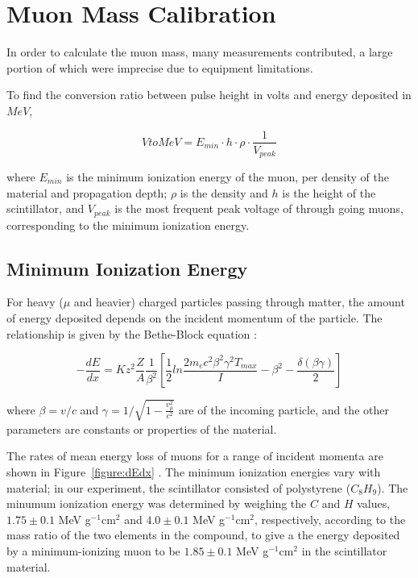 
\section{Muon Mass Calibration}

In order to calculate the muon mass, many measurements contributed, a
large portion of which were imprecise due to equipment limitations. 

To find the conversion ratio between pulse height in volts and energy
deposited in $MeV$, 

\begin{equation} VtoMeV = E_{min}\cdot h\cdot\rho\cdot\frac{1}{V_{peak}}\end{equation}   

where $E_{min}$ is the minimum ionization energy of the muon, per
density of the material and propagation depth; $\rho$ is the density
and $h$ is the height of the scintillator, and $V_{peak}$ is the most
frequent peak voltage of through going muons, corresponding to the
minimum ionization energy.

\subsection{Minimum Ionization Energy}

For heavy ($\mu$ and heavier) charged particles passing through
matter, the amount of energy deposited depends on the incident
momentum of the particle. The relationship is given by the Bethe-Block
equation \cite{yao}:

\begin{equation}
-\frac{dE}{dx} = Kz^2\frac{Z}{A}\frac{1}{\beta^2}\left[\frac{1}{2}ln\frac{2m_ec^2\beta^2\gamma^2T_{max}}{I} - \beta^2 - \frac{\delta(\beta\gamma)}{2}\right]
\end{equation}

where $\beta = v/c$ and $\gamma = 1/\sqrt{1 - \frac{v_{\mu}^2}{c^2}}$
are of the incoming particle, and the other parameters are constants
or properties of the material.

The rates of mean energy loss of muons for a range of incident momenta
are shown in Figure~\ref{figure:dEdx} \cite{yao}. The minimum
ionization energies vary with material; in our experiment, the
scintillator consisted of polystyrene ($C_8H_9$). The minumum
ionization energy was determined by weighing the $C$ and $H$ values,
$1.75\pm 0.1$ MeV g$^{-1}$cm$^{2}$ and $4.0\pm 0.1$
MeV g$^{-1}$cm$^{2}$, respectively, according to the mass ratio of the
two elements in the compound, to give a the energy deposited by a
minimum-ionizing muon to be $1.85 \pm 0.1$ MeV g$^{-1}$cm$^{2}$ in the
scintillator material.

